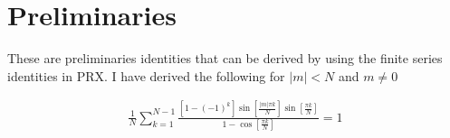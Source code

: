 \documentclass[10pt, hidelinks, superscriptaddress, amsmath, amssymb, aps, pre]{revtex4-2}
\newif\ifmainText
\begin{document}
% 
% 

\ifmainText\mainTexttrue

\section*{Preliminaries}\label{sec:intro}


These are preliminaries identities that can be derived by using the finite series identities in PRX. I have derived the following for $|m|<N$ and $m\not=0$

\begin{align}
\frac{1}{N}\sum_{k=1}^{N-1}\frac{\left[1-(-1)^k\right]\sin\left[\frac{|m|\pi k}{N}\right]\sin\left[\frac{\pi k}{N}\right]}{1-\cos\left[\frac{\pi k}{N}\right]}=1
\label{eq:id_1}
\end{align}
\end{document}

